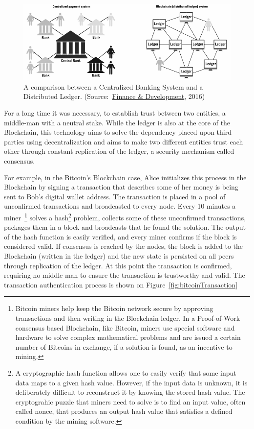 \begin{figure}[h]
  \centering
  \includegraphics[width=1\linewidth]{imgs/blockchainvscentralizedNetwork.png}
  \caption{\label{fig:centralizedvsdescentralized} A comparison between a
  Centralized Banking System and a Distributed Ledger.
  (Source:~\href{https://www.imf.org/external/pubs/ft/fandd/}{Finance \&
  Development}, 2016)}
\end{figure}

For a long time it was necessary, to establish trust between two entities, a
middle-man with a neutral stake. While the ledger is also at the core of the
Blockchain, this technology aims to solve the dependency placed upon third
parties using decentralization and aims to make two different entities trust
each other through constant replication of the ledger, a security mechanism
called consensus.

For example, in the Bitcoin's Blockchain case, Alice initializes this process
in the Blockchain by signing a transaction that describes some of her money is
being sent to Bob's digital wallet address. The transaction is placed in a pool
of unconfirmed transactions and broadcasted to every node. Every 10 minutes a
miner~\footnote{Bitcoin miners help keep the Bitcoin network secure by
approving transactions and then writing in the Blockchain ledger. In a
Proof-of-Work consensus based Blockchain, like Bitcoin, miners use special
software and hardware to solve complex mathematical problems and are issued a
certain number of Bitcoins in exchange, if a solution is found, as an incentive
to mining.} solves a hash\footnote{A cryptographic hash function allows one to
easily verify that some input data maps to a given hash value. However, if the
input data is unknown, it is deliberately difficult to reconstruct it by
knowing the stored hash value. The cryptograhic puzzle that miners need to
solve is to find an input value, often called nonce, that produces an output
hash value that satisfies a defined condition by the mining software.} problem,
collects some of these unconfirmed transactions, packages them in a block and
broadcasts that he found the solution. The output of the hash function is
easily verified, and every miner confirms if the block is considered valid. If
consensus is reached by the nodes, the block is added to the Blockchain
(written in the ledger) and the new state is persisted on all peers through
replication of the ledger. At this point the transaction is confirmed,
requiring no middle man to ensure the transaction is trustworthy and valid. The
transaction authentication process is shown on
Figure~\ref{fig:bitcoinTransaction}

